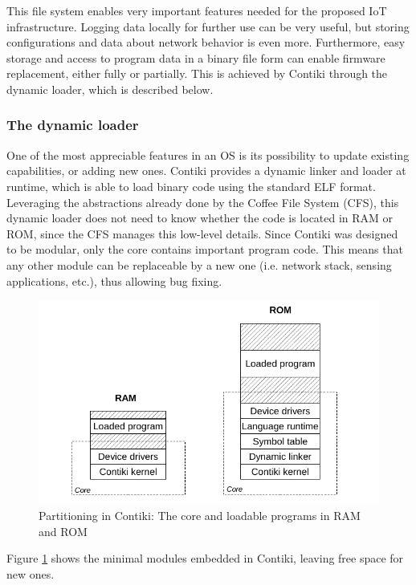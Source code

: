 This file system enables very important features needed for the proposed IoT infrastructure.
Logging data locally for further use can be very useful, but storing configurations and data about network behavior is even more.
Furthermore, easy storage and access to program data in a binary file form can enable firmware replacement, either fully or partially.
This is achieved by Contiki through the dynamic loader, which is described below.

\subsubsection{The dynamic loader}
One of the most appreciable features in an OS is its possibility to update existing capabilities, or adding new ones.
Contiki provides a dynamic linker and loader at runtime, which is able to load binary code using the standard ELF format\cite{tis1995tool}.
Leveraging the abstractions already done by the Coffee File System (CFS), this dynamic loader does not need to know whether the code is located in RAM or ROM, since the CFS manages this low-level details.
Since Contiki was designed to be modular, only the core contains important program code.
This means that any other module can be replaceable by a new one (i.e. network stack, sensing applications, etc.), thus allowing bug fixing.

\begin{figure}[htb]
	\centering
	\includegraphics[width=1\columnwidth]{chapters/background.images/ContikiModules.pdf}
	\caption{Partitioning in Contiki: The core and loadable programs in RAM and ROM\cite{dunkels06runtime}}
	\label{fig:ContikiModules}
\end{figure}

Figure \ref{fig:ContikiModules} shows the minimal modules embedded in Contiki, leaving free space for new ones.

